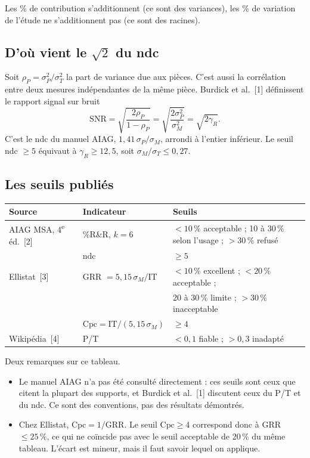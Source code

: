 \documentclass[11pt,a4paper]{article}
\theoremstyle{sj}
\theoremstyle{definition}
\theoremstyle{remark}
\providecommand{\og}{\guillemotleft\nobreakspace}
\providecommand{\fg}{\nobreakspace\guillemotright}
\newcommand{\gR}{\gamma_R}
\begin{document}
Les \% de contribution s'additionnent (ce sont des variances), les \% de variation de l'étude ne s'additionnent pas (ce sont des racines).

\subsection{D'où vient le $\sqrt2$ du ndc}

Soit $\rho_P=\sigma_P^2/\sigma_T^2$ la part de variance due aux pièces. C'est aussi la corrélation entre deux mesures indépendantes de la même pièce. Burdick et al.~[1] définissent le rapport signal sur bruit
\[
\mathrm{SNR}=\sqrt{\frac{2\rho_P}{1-\rho_P}}=\sqrt{\frac{2\sigma_P^2}{\sigma_M^2}}=\sqrt{2\gR}.
\]
C'est le ndc du manuel AIAG, $1{,}41\,\sigma_P/\sigma_M$, arrondi à l'entier inférieur. Le seuil ndc $\ge5$ équivaut à $\gR\ge12{,}5$, soit $\sigma_M/\sigma_T\le0{,}27$.

\subsection{Les seuils publiés}

\begin{center}
\small
\begin{tabular}{p{3.3cm} l p{6cm}}
\toprule
Source & Indicateur & Seuils\\
\midrule
AIAG MSA, 4\textsuperscript{e} éd.~[2] & \%R\&R, $k=6$ & $<10\,\%$ acceptable ; 10 à 30\,\% selon l'usage ; $>30\,\%$ refusé\\
 & ndc & $\ge5$\\
Ellistat~[3] & GRR $=5{,}15\,\sigma_M/\mathrm{IT}$ & $<10\,\%$ excellent ; $<20\,\%$ acceptable ;\\
 & & 20 à 30\,\% limite ; $>30\,\%$ inacceptable\\
 & $\mathrm{Cpc}=\mathrm{IT}/(5{,}15\,\sigma_M)$ & $\ge4$\\
Wikipédia~[4] & P/T & $<0{,}1$ fiable ; $>0{,}3$ inadapté\\
\bottomrule
\end{tabular}
\end{center}

Deux remarques sur ce tableau.
\begin{itemize}[leftmargin=1.4em]
\item Le manuel AIAG n'a pas été consulté directement : ces seuils sont ceux que citent la plupart des supports, et Burdick et al.~[1] discutent ceux du P/T et du ndc. Ce sont des conventions, pas des résultats démontrés.
\item Chez Ellistat, $\mathrm{Cpc}=1/\mathrm{GRR}$. Le seuil $\mathrm{Cpc}\ge4$ correspond donc à GRR $\le25\,\%$, ce qui ne coïncide pas avec le seuil \og acceptable\fg{} de 20\,\% du même tableau. L'écart est mineur, mais il faut savoir lequel on applique.
\end{itemize}
\end{document}
